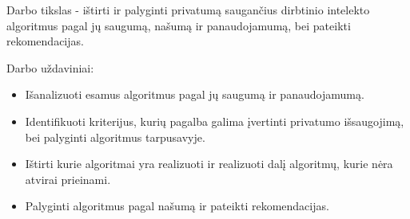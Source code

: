 \documentclass{VUMIFInfBakalaurinis}
\begin{document}
	\par Darbo tikslas - ištirti ir palyginti privatumą saugančius dirbtinio intelekto algoritmus pagal jų saugumą, našumą ir panaudojamumą, bei pateikti rekomendacijas.
	\par Darbo uždaviniai:
	\begin{itemize}
		\item Išanalizuoti esamus algoritmus pagal jų saugumą ir panaudojamumą.
		\item Identifikuoti kriterijus, kurių pagalba galima įvertinti privatumo išsaugojimą, bei palyginti algoritmus tarpusavyje.
		\item Ištirti kurie algoritmai yra realizuoti ir realizuoti dalį algoritmų, kurie nėra atvirai prieinami.
		\item Palyginti algoritmus pagal našumą ir pateikti rekomendacijas.
	\end{itemize}
\end{document}
